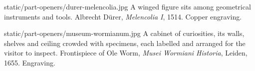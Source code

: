 \documentclass{mimosis}
\begin{document}
%
  {static/part-openers/durer-melencolia.jpg}%
  {\partplatecaption
    {A winged figure sits among geometrical instruments and tools.}
    {Albrecht Dürer, \emph{Melencolia I}, 1514.
     Copper engraving.}}
\label{part:conclusion}


%
  {static/part-openers/museum-wormianum.jpg}%
  {\partplatecaption
    {A cabinet of curiosities, its walls, shelves and ceiling crowded with
     specimens, each labelled and arranged for the visitor to inspect.}
    {Frontispiece of Ole Worm, \emph{Musei Wormiani Historia}, Leiden, 1655.
     Engraving.}}
\clearpage
\appendix
{}



\backmatter

\begingroup
\let\clearpage\relax
\renewcommand*{\glossentryname}[1]{\glsnamefont{\Glsentryname{#1}}}
\renewcommand*{\glossentrydesc}[1]{\Glsentrydesc{#1}}
\glsaddall
\printglossary[type=\acronymtype]
\newpage
\renewcommand{\glsnamefont}[1]{\textbf{#1}}
\printglossary[style=altlist]
\endgroup


\printindex



\end{document}
